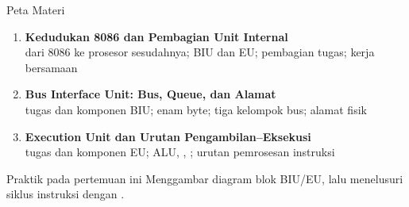 \documentclass[aspectratio=169,11pt]{beamer}
\begin{document}
\begin{frame}{Peta Materi}
\small
\begin{enumerate}
    \item \textbf{Kedudukan 8086 dan Pembagian Unit Internal}\\
          {\footnotesize dari 8086 ke prosesor sesudahnya; BIU dan
          EU; pembagian tugas; kerja bersamaan}

    \vspace{0.25em}
    \item \textbf{Bus Interface Unit: Bus, Queue, dan Alamat}\\
          {\footnotesize tugas dan komponen BIU;  enam
          byte; tiga kelompok bus; alamat fisik}

    \vspace{0.25em}
    \item \textbf{Execution Unit dan Urutan Pengambilan--Eksekusi}\\
          {\footnotesize tugas dan komponen EU; ALU, ,
          ; urutan pemrosesan instruksi}
\end{enumerate}

\vspace{0.35em}
\begin{block}{Praktik pada pertemuan ini}
\small Menggambar diagram blok BIU/EU, lalu menelusuri siklus
instruksi dengan .
\end{block}
\end{frame}

\end{document}
